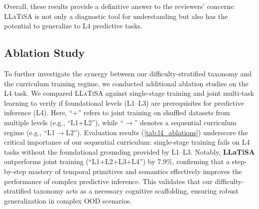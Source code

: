 \documentclass[11pt]{article}
\begin{document}
Overall, these results provide a definitive answer to the reviewers' concerns: \textsc{LLaTiSA} is not only a diagnostic tool for understanding but also has the potential to generalize to L4 predictive tasks.

\begin{table}[t]
\centering
{}
\caption{Ablation study on the L4 task. All experiments are conducted on OOD datasets.}
\label{tab:l4_ablations}
\end{table}


\subsection{Ablation Study}
To further investigate the synergy between our difficulty-stratified taxonomy and the curriculum training regime, we conducted additional ablation studies on the L4 task. We compared \textsc{LLaTiSA} against single-stage training and joint multi-task learning to verify if foundational levels (L1–L3) are prerequisites for predictive inference (L4). Here, ``+'' refers to joint training on shuffled datasets from multiple levels (e.g., ``L1+L2''), while ``$\rightarrow$'' denotes a sequential curriculum regime (e.g., ``L1$\rightarrow$L2''). Evaluation results (\cref{tab:l4_ablations}) underscore the critical importance of our sequential curriculum: single-stage training fails on L4 tasks without the foundational grounding provided by L1–L3. Notably, \textbf{LLaTiSA} outperforms joint training (``L1+L2+L3+L4'') by 7.9\%, confirming that a step-by-step mastery of temporal primitives and semantics effectively improves the performance of complex predictive inference. This validates that our difficulty-stratified taxonomy acts as a necessary cognitive scaffolding, ensuring robust generalization in complex OOD scenarios.
\end{document}
